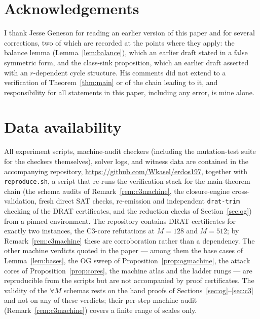 \documentclass[11pt]{article}
\theoremstyle{definition}
\newcommand{\OG}{\mathrm{OG}}
\begin{document}
\section*{Acknowledgements}
I thank Jesse Geneson for reading an earlier version of this paper and for
several corrections, two of which are recorded at the points where they
apply: the balance lemma (Lemma~\ref{lem:balance}), which an earlier draft
stated in a false symmetric form, and the class-sink proposition, which an
earlier draft asserted with an $r$-dependent cycle structure. His comments
did not extend to a verification of Theorem~\ref{thm:main} or of the chain
leading to it, and responsibility for all statements in this paper,
including any error, is mine alone.

\section*{Data availability}
All experiment scripts, machine-audit checkers (including the mutation-test
suite for the checkers themselves), solver logs, and witness data are
contained in the accompanying repository,
\url{https://github.com/Wkasel/erdos197}, together with
\texttt{reproduce.sh}, a script that re-runs the verification stack for the
main-theorem chain (the schema audits of Remark~\ref{rem:c3machine}, the
closure-engine cross-validation, fresh direct SAT checks, re-emission and
independent \texttt{drat-trim} checking of the DRAT certificates, and the
reduction checks of Section~\ref{sec:og}) from a pinned environment.
The repository contains DRAT certificates for exactly two instances, the
C3-core refutations at $M = 128$ and $M = 512$; by
Remark~\ref{rem:c3machine} these are corroboration rather than a
dependency. The other machine verdicts quoted in the paper --- among them
the base cases of Lemma~\ref{lem:bases}, the $\OG$ sweep of
Proposition~\ref{prop:ogmachine}, the attack cores of
Proposition~\ref{prop:cores}, the machine atlas and the ladder rungs ---
are reproducible from the scripts but are not accompanied by proof
certificates. The validity of the $\forall M$ schemas
rests on the hand proofs of Sections~\ref{sec:og}--\ref{sec:c3} and not on
any of these verdicts; their per-step machine audit
(Remark~\ref{rem:c3machine}) covers a finite range of scales only.
\end{document}
